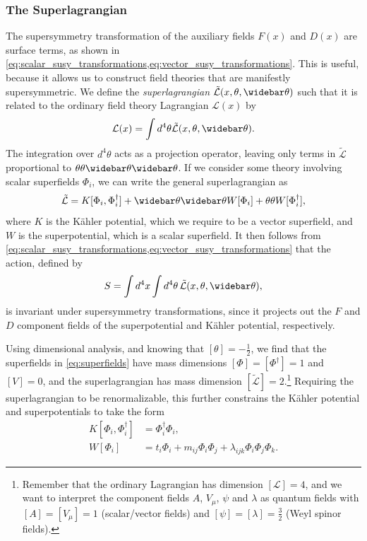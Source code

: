 \subsubsection{The Superlagrangian}
The supersymmetry transformation of the auxiliary fields $F(x)$ and $D(x)$ are surface terms, as shown in \cref{eq:scalar_susy_transformations,eq:vector_susy_transformations}.
This is useful, because it allows us to construct field theories that are manifestly supersymmetric.
We define the \emph{superlagrangian} $\tilde{\mathcal{L}}(x,\theta,\thetabar)$ such that it is related to the ordinary field theory Lagrangian $\mathcal{L}(x)$ by
\begin{equation}
    \mathcal{L}(x) = \int d^4\theta \tilde{\mathcal{L}}(x,\theta,\thetabar).
\end{equation}
The integration over $d^4\theta$ acts as a projection operator, leaving only terms in $\tilde{\mathcal{L}}$ proportional to $\thetafour$.
If we consider some theory involving scalar superfields $\Phi_i$, we can write the general superlagrangian as
\begin{equation}
    \tilde{\mathcal{L}} = K[\Phi_i,\Phi_i^\dagger] + \thetabartwo W[\Phi_i] + \thetatwo W[\Phi_i^\dagger],
\end{equation}
where $K$ is the K\"ahler potential, which we require to be a vector superfield, and $W$ is the superpotential, which is a scalar superfield.
It then follows from \cref{eq:scalar_susy_transformations,eq:vector_susy_transformations} that the action, defined by
\begin{equation}
    S = \int d^4x \int d^4\theta \, \tilde{\mathcal{L}}(x,\theta,\thetabar),
\end{equation}
is invariant under supersymmetry transformations, since it projects out the $F$ and $D$ component fields of the superpotential and K\"ahler potential, respectively.

Using dimensional analysis, and knowing that $[\theta]=-\frac{1}{2}$, we find that the superfields in \cref{eq:superfields} have mass dimensions $[\Phi]=[\Phi^\dagger]=1$ and $[V]=0$, and the superlagrangian has mass dimension $[\tilde{\mathcal{L}}]=2$.\footnote{Remember that the ordinary Lagrangian has dimension $[\mathcal{L}]=4$, and we want to interpret the component fields $A$, $V_\mu$, $\psi$ and $\lambda$ as quantum fields with $[A]=[V_\mu]=1$ (scalar/vector fields) and $[\psi]=[\lambda]=\frac{3}{2}$ (Weyl spinor fields).}
Requiring the superlagrangian to be renormalizable, this further constrains the K\"ahler potential and superpotentials to take the form
\begin{subequations}
\begin{align}
    K[\Phi_i,\Phi_i^\dagger] &= \Phi_i^\dagger\Phi_i,
    \\
    W[\Phi_i] &= t_i \Phi_i + m_{ij} \Phi_i\Phi_j + \lambda_{ijk} \Phi_i\Phi_j\Phi_k.
    \label{eq:superpotential_def}
\end{align}
\end{subequations}


